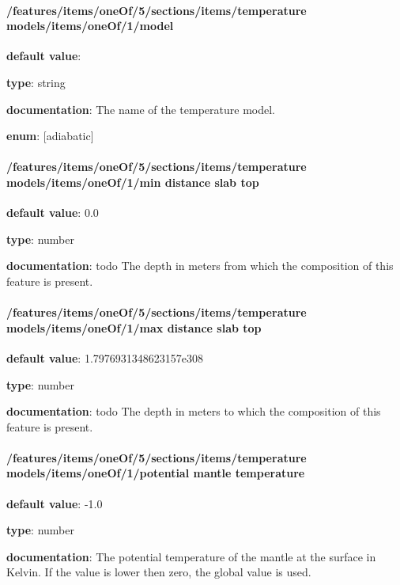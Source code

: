 \paragraph{/features/items/oneOf/5/sections/items/temperature models/items/oneOf/1/model} \begin{itemized}
\item {\bf default value}: 
\item {\bf type}: string
\item {\bf documentation}: The name of the temperature model.
\item {\bf enum}: [adiabatic]\end{itemized}\paragraph{/features/items/oneOf/5/sections/items/temperature models/items/oneOf/1/min distance slab top} \begin{itemized}
\item {\bf default value}: 0.0
\item {\bf type}: number
\item {\bf documentation}: todo The depth in meters from which the composition of this feature is present.
\end{itemized}\paragraph{/features/items/oneOf/5/sections/items/temperature models/items/oneOf/1/max distance slab top} \begin{itemized}
\item {\bf default value}: 1.7976931348623157e308
\item {\bf type}: number
\item {\bf documentation}: todo The depth in meters to which the composition of this feature is present.
\end{itemized}\paragraph{/features/items/oneOf/5/sections/items/temperature models/items/oneOf/1/potential mantle temperature} \begin{itemized}
\item {\bf default value}: -1.0
\item {\bf type}: number
\item {\bf documentation}: The potential temperature of the mantle at the surface in Kelvin. If the value is lower then zero, the global value is used.

\end{itemized}
